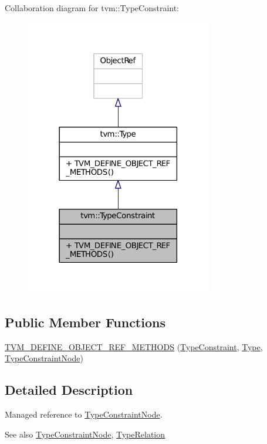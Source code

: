 Collaboration diagram for tvm\+:\+:Type\+Constraint\+:
\nopagebreak
\begin{figure}[H]
\begin{center}
\leavevmode
\includegraphics[width=230pt]{classtvm_1_1TypeConstraint__coll__graph}
\end{center}
\end{figure}
\subsection*{Public Member Functions}
\begin{DoxyCompactItemize}
\item 
\hyperlink{classtvm_1_1TypeConstraint_a4aa7caa008e2810f5b999c85b5e3b62c}{T\+V\+M\+\_\+\+D\+E\+F\+I\+N\+E\+\_\+\+O\+B\+J\+E\+C\+T\+\_\+\+R\+E\+F\+\_\+\+M\+E\+T\+H\+O\+DS} (\hyperlink{classtvm_1_1TypeConstraint}{Type\+Constraint}, \hyperlink{classtvm_1_1Type}{Type}, \hyperlink{classtvm_1_1TypeConstraintNode}{Type\+Constraint\+Node})
\end{DoxyCompactItemize}


\subsection{Detailed Description}
Managed reference to \hyperlink{classtvm_1_1TypeConstraintNode}{Type\+Constraint\+Node}. 

\begin{DoxySeeAlso}{See also}
\hyperlink{classtvm_1_1TypeConstraintNode}{Type\+Constraint\+Node}, \hyperlink{classtvm_1_1TypeRelation}{Type\+Relation} 
\end{DoxySeeAlso}


